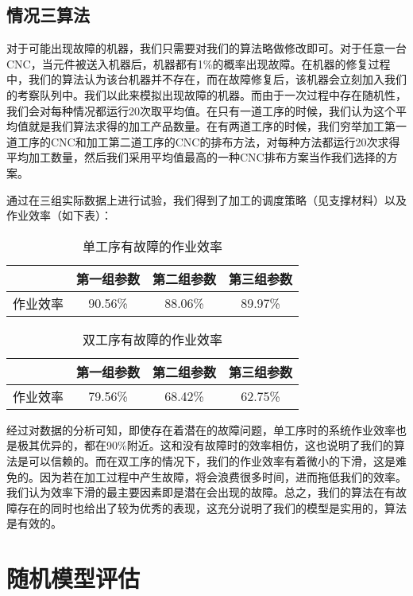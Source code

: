 \documentclass{cumcmthesis}
\begin{document}
\subsection{情况三算法}

对于可能出现故障的机器，我们只需要对我们的算法略做修改即可。对于任意一台CNC，当元件被送入机器后，机器都有1\%的概率出现故障。在机器的修复过程中，我们的算法认为该台机器并不存在，而在故障修复后，该机器会立刻加入我们的考察队列中。我们以此来模拟出现故障的机器。而由于一次过程中存在随机性，我们会对每种情况都运行20次取平均值。在只有一道工序的时候，我们认为这个平均值就是我们算法求得的加工产品数量。在有两道工序的时候，我们穷举加工第一道工序的CNC和加工第二道工序的CNC的排布方法，对每种方法都运行20次求得平均加工数量，然后我们采用平均值最高的一种CNC排布方案当作我们选择的方案。

通过在三组实际数据上进行试验，我们得到了加工的调度策略（见支撑材料）以及作业效率（如下表）：

\begin{table}[!htbp]
\caption{单工序有故障的作业效率} \centering
\begin{tabular}{cccc}
\hline
&第一组参数&第二组参数&第三组参数\\
\hline
作业效率&90.56\%&88.06\%&89.97\%\\
\hline
\end{tabular}
\end{table}

\begin{table}[!htbp]
\caption{双工序有故障的作业效率} \centering
\begin{tabular}{cccc}
\hline
&第一组参数&第二组参数&第三组参数\\
\hline
作业效率&79.56\%&68.42\%&62.75\%\\
\hline
\end{tabular}
\end{table}

经过对数据的分析可知，即使存在着潜在的故障问题，单工序时的系统作业效率也是极其优异的，都在90\%附近。这和没有故障时的效率相仿，这也说明了我们的算法是可以信赖的。而在双工序的情况下，我们的作业效率有着微小的下滑，这是难免的。因为若在加工过程中产生故障，将会浪费很多时间，进而拖低我们的效率。我们认为效率下滑的最主要因素即是潜在会出现的故障。总之，我们的算法在有故障存在的同时也给出了较为优秀的表现，这充分说明了我们的模型是实用的，算法是有效的。

\section{随机模型评估}
\end{document}
